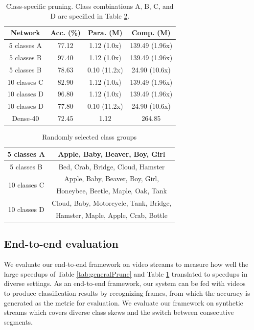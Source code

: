 \documentclass[pageno]{jpaper}
\begin{document}
\begin{table}
    \caption{Class-specific pruning. Class combinations A, B, C, and D are specified in Table \ref{tab:classGroups}.}
    \label{tab:csPruning}

    \centering
    \begin{tabular}{ c|c|cc } 
     \hline
     Network & Acc. (\%) & Para. (M) & Comp. (M) \\ 
     \hline
     5 classes A & 77.12 & 1.12 (1.0x)& 139.49 (1.96x)\\
     5 classes B & 97.40 & 1.12 (1.0x)& 139.49 (1.96x)\\
     5 classes B & 78.63 & 0.10 (11.2x) & 24.90 (10.6x)\\
     \hline
     10 classes C & 82.90 & 1.12 (1.0x)& 139.49 (1.96x) \\
     10 classes D & 96.80 & 1.12 (1.0x)& 139.49 (1.96x)\\
     10 classes D & 77.80 & 0.10 (11.2x)& 24.90 (10.6x)\\
     \hline
     Dense-40 & 72.45 & 1.12 & 264.85 \\
     \hline
    \end{tabular}
\end{table}

\begin{table}
    \centering
    \begin{tabular}{c|c}
    \hline
     5 classes A & Apple, Baby, Beaver, Boy, Girl \\
     \hline
     5 classes B & Bed, Crab, Bridge, Cloud, Hamster \\
     \hline
     \multirow{2}{*}{10 classes C} & Apple, Baby, Beaver, Boy, Girl, \\
       & Honeybee, Beetle, Maple, Oak, Tank \\
     \hline
     \multirow{2}{*}{10 classes D} & Cloud, Baby, Motorcycle, Tank, Bridge, \\
       & Hamster, Maple, Apple, Crab, Bottle\\
    \hline
    \end{tabular}
    \caption{Randomly selected class groups}
    \label{tab:classGroups}
\end{table}




\subsection{End-to-end evaluation}
We evaluate our end-to-end framework on video streams to measure how well the large speedups of Table \ref{tab:generalPrune} and Table \ref{tab:csPruning} translated to speedups in diverse settings. As an end-to-end framework, our system can be fed with videos to produce classification results by recognizing frames, from which the accuracy is generated as the metric for evaluation. We evaluate our framework on synthetic streams which covers diverse class skews and the switch between consecutive segments.
\end{document}
